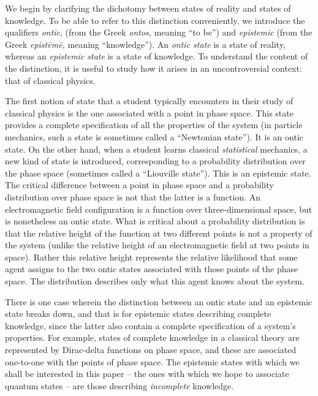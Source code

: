 \documentclass[pra,nofootinbib,showpacs,12pt]{revtex4}
\begin{document}
We begin by clarifying the dichotomy between states of reality and states of
knowledge. To be able to refer to this distinction conveniently, we
introduce the qualifiers \emph{ontic}, (from the Greek \emph{ontos, }meaning
``to be'') and \emph{epistemic} (from the Greek \emph{epist\={e}m\={e}, }%
meaning ``knowledge''). An \emph{ontic state} is a state of reality, whereas
an \emph{epistemic state} is a state of knowledge. To understand the content
of the distinction, it is useful to study how it arises in an
uncontroversial context: that of classical physics.

The first notion of state that a student typically encounters in their study
of classical physics is the one associated with a point in phase space. This
state provides a complete specification of all the properties of the system
(in particle mechanics, such a state is sometimes called a ``Newtonian
state''). It is an ontic state. On the other hand, when a student learns
classical \emph{statistical} mechanics, a new kind of state is introduced,
corresponding to a probability distribution over the phase space (sometimes
called a ``Liouville state''). This is an epistemic state. The critical
difference between a point in phase space and a probability distribution
over phase space is not that the latter is a function. An electromagnetic
field configuration is a function over three-dimensional space, but is
nonetheless an ontic state. What is critical about a probability
distribution is that the relative height of the function at two different
points is not a property of the system (unlike the relative height of an
electromagnetic field at two points in space). Rather this relative height
represents the relative likelihood that some agent assigns to the two ontic
states associated with those points of the phase space. The distribution
describes only what this agent knows about the system.

There is one case wherein the distinction between an ontic state and an
epistemic state breaks down, and that is for epistemic states describing
complete knowledge, since the latter also contain a complete specification
of a system's properties. For example, states of complete knowledge in a
classical theory are represented by Dirac-delta functions on phase space,
and these are associated one-to-one with the points of phase space. The
epistemic states with which we shall be interested in this paper -- the ones
with which we hope to associate quantum states -- are those describing \emph{%
incomplete} knowledge.
\end{document}
